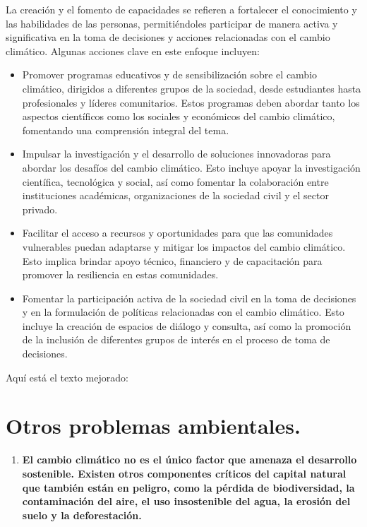 \documentclass[
  letterpaper,
  DIV=11,
  numbers=noendperiod]{scrartcl}
\providecommand{\tightlist}{%
  \setlength{\itemsep}{0pt}\setlength{\parskip}{0pt}}\usepackage{longtable,booktabs,array}
\begin{document}
La creación y el fomento de capacidades se refieren a fortalecer el
conocimiento y las habilidades de las personas, permitiéndoles
participar de manera activa y significativa en la toma de decisiones y
acciones relacionadas con el cambio climático. Algunas acciones clave en
este enfoque incluyen:

\begin{itemize}
\tightlist
\item
  Promover programas educativos y de sensibilización sobre el cambio
  climático, dirigidos a diferentes grupos de la sociedad, desde
  estudiantes hasta profesionales y líderes comunitarios. Estos
  programas deben abordar tanto los aspectos científicos como los
  sociales y económicos del cambio climático, fomentando una comprensión
  integral del tema.
\item
  Impulsar la investigación y el desarrollo de soluciones innovadoras
  para abordar los desafíos del cambio climático. Esto incluye apoyar la
  investigación científica, tecnológica y social, así como fomentar la
  colaboración entre instituciones académicas, organizaciones de la
  sociedad civil y el sector privado.
\item
  Facilitar el acceso a recursos y oportunidades para que las
  comunidades vulnerables puedan adaptarse y mitigar los impactos del
  cambio climático. Esto implica brindar apoyo técnico, financiero y de
  capacitación para promover la resiliencia en estas comunidades.
\item
  Fomentar la participación activa de la sociedad civil en la toma de
  decisiones y en la formulación de políticas relacionadas con el cambio
  climático. Esto incluye la creación de espacios de diálogo y consulta,
  así como la promoción de la inclusión de diferentes grupos de interés
  en el proceso de toma de decisiones.
\end{itemize}

Aquí está el texto mejorado:

\hypertarget{otros-problemas-ambientales.}{%
\section{Otros problemas
ambientales.}\label{otros-problemas-ambientales.}}

\begin{enumerate}
\def\labelenumi{\alph{enumi}.}
\tightlist
\item
  \textbf{El cambio climático no es el único factor que amenaza el
  desarrollo sostenible. Existen otros componentes críticos del capital
  natural que también están en peligro, como la pérdida de
  biodiversidad, la contaminación del aire, el uso insostenible del
  agua, la erosión del suelo y la deforestación.}
\end{enumerate}
\end{document}
